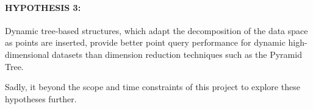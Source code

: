 \paragraph{\textbf{HYPOTHESIS 3:}} Dynamic tree-based structures, which adapt the decomposition of the data space as points are inserted, provide better point query performance for dynamic high-dimensional datasets than dimension reduction techniques such as the Pyramid Tree.

Sadly, it beyond the scope and time constraints of this project to explore these hypotheses further.